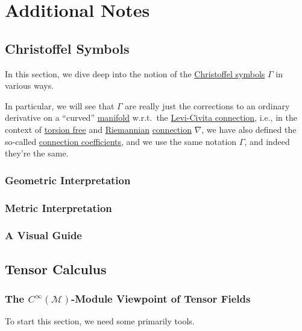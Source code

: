 \chapter{Additional Notes}
\section{Christoffel Symbols}\label{section:Christoffel-symbols}
In this section, we dive deep into the notion of the \hyperref[not:Christoffel-symbol]{Christoffel symbols} \(\Gamma \) in various ways.

In particular, we will see that \(\Gamma \) are really just the corrections to an ordinary derivative on a ``curved'' \hyperref[def:smooth-manifold]{manifold} w.r.t.\ the \hyperref[def:Levi-Civita-connection]{Levi-Civita connection}, i.e., in the context of \hyperref[def:torsion-free]{torsion free} and \hyperref[def:Riemannian]{Riemannian} \hyperref[def:linear-connection]{connection} \(\nabla \), we have also defined the so-called \hyperref[not:connection-coefficient]{connection coefficients}, and we use the same notation \(\Gamma \), and indeed they're the same.

\subsection{Geometric Interpretation}

\subsection{Metric Interpretation}

\subsection{A Visual Guide}

\section{Tensor Calculus}

\subsection{The \(C^{\infty} (\mathcal{M} )\)-Module Viewpoint of Tensor Fields}\label{subsection:C-infty-module-viewpoint-of-tensor-fields}
To start this section, we need some primarily tools.

